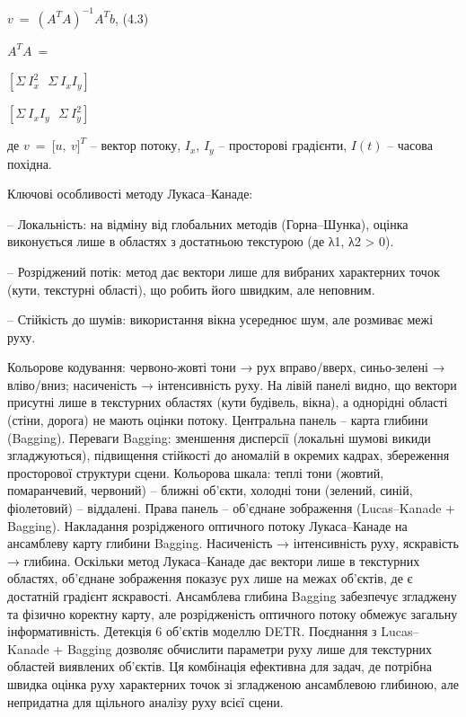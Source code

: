 \documentclass[
]{article}
\begin{document}
\(v\  = \ \left( A^{T}A \right)^{- 1}A^{T}b\), (4.3)

\(A^{T}A\  =\)

\(\left\lbrack \Sigma\ I_{x}^{2}\ \ \ \Sigma\ I_{x}I_{y} \right\rbrack\)

\(\left\lbrack \Sigma\ I_{x}I_{y}\ \ \ \Sigma\ I_{y}^{2} \right\rbrack	\)

де \(v\  = \ \lbrack u,\ v\rbrack^{T}\) -- вектор потоку, \(I_{x}\), \(I_{y}\) -- просторові градієнти, \(I(t)\) -- часова похідна.

Ключові особливості методу Лукаса--Канаде:

-- Локальність: на відміну від глобальних методів (Горна--Шунка), оцінка виконується лише в областях з достатньою текстурою (де λ1, λ2 \textgreater{} 0).

-- Розріджений потік: метод дає вектори лише для вибраних характерних точок (кути, текстурні області), що робить його швидким, але неповним.

-- Стійкість до шумів: використання вікна усереднює шум, але розмиває межі руху.

Кольорове кодування: червоно-жовті тони → рух вправо/вверх, синьо-зелені → вліво/вниз; насиченість → інтенсивність руху. На лівій панелі видно, що вектори присутні лише в текстурних областях (кути будівель, вікна), а однорідні області (стіни, дорога) не мають оцінки потоку. Центральна панель -- карта глибини (Bagging). Переваги Bagging: зменшення дисперсії (локальні шумові викиди згладжуються), підвищення стійкості до аномалій в окремих кадрах, збереження просторової структури сцени. Кольорова шкала: теплі тони (жовтий, помаранчевий, червоний) -- ближні об'єкти, холодні тони (зелений, синій, фіолетовий) -- віддалені. Права панель -- об'єднане зображення (Lucas--Kanade + Bagging). Накладання розрідженого оптичного потоку Лукаса--Канаде на ансамблеву карту глибини Bagging. Насиченість → інтенсивність руху, яскравість → глибина. Оскільки метод Лукаса--Канаде дає вектори лише в текстурних областях, об'єднане зображення показує рух лише на межах об'єктів, де є достатній градієнт яскравості. Ансамблева глибина Bagging забезпечує згладжену та фізично коректну карту, але розрідженість оптичного потоку обмежує загальну інформативність. Детекція 6 об'єктів моделлю DETR. Поєднання з Lucas--Kanade + Bagging дозволяє обчислити параметри руху лише для текстурних областей виявлених об'єктів. Ця комбінація ефективна для задач, де потрібна швидка оцінка руху характерних точок зі згладженою ансамблевою глибиною, але непридатна для щільного аналізу руху всієї сцени.
\end{document}
